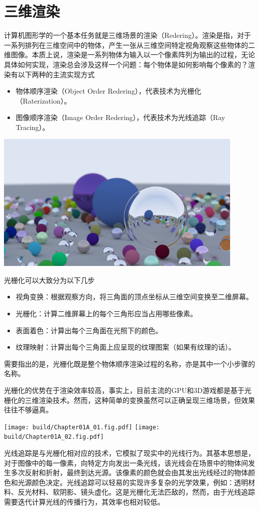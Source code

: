 \chapter{三维渲染}

计算机图形学的一个基本任务就是三维场景的渲染（Redering）。渲染是指，对于一系列排列在三维空间中的物体，产生一张从三维空间特定视角观察这些物体的二维图像。本质上说，渲染是一系列物体为输入以一个像素阵列为输出的过程，无论具体如何实现，渲染总会涉及这样一个问题：每个物体是如何影响每个像素的？渲染有以下两种的主流实现方式
\begin{itemize}
    \item 物体顺序渲染（Object Order Redering），代表技术为光栅化（Raterization）。
    \item 图像顺序渲染（Image Order Redering），代表技术为光线追踪（Ray Tracing）。
\end{itemize}

\begin{Figure}
    \includegraphics[width=12cm]{image/Final.png}
\end{Figure}

光栅化可以大致分为以下几步
\begin{itemize}
    \item 视角变换：根据观察方向，将三角面的顶点坐标从三维空间变换至二维屏幕。
    \item 光栅化：计算二维屏幕上的每个三角形应当占用哪些像素。
    \item 表面着色：计算出每个三角面在光照下的颜色。
    \item 纹理映射：计算出每个三角面上应呈现的纹理图案（如果有纹理的话）。
\end{itemize}
需要指出的是，光栅化既是整个物体顺序渲染过程的名称，亦是其中一个小步骤的名称。

光栅化的优势在于渲染效率较高，事实上，目前主流的GPU和3D游戏都是基于光栅化的三维渲染技术。然而，这种简单的变换虽然可以正确呈现三维场景，但效果往往不够逼真。

\begin{Figure}
    \texttt{[image: build/Chapter01A\_01.fig.pdf]}
    \texttt{[image: build/Chapter01A\_02.fig.pdf]}
\end{Figure}

光线追踪是与光栅化相对应的技术，它模拟了现实中的光线行为。其基本思想是，对于图像中的每一像素，向特定方向发出一条光线，该光线会在场景中的物体间发生多次反射和折射，最终到达光源。该像素的颜色就会由其发出光线经过的物体颜色和光源颜色决定。光线追踪可以轻易的实现许多复杂的光学效果，例如：透明材料、反光材料、软阴影、镜头虚化。这是光栅化无法匹敌的，然而，由于光线追踪需要迭代计算光线的传播行为，其效率也相对较低。